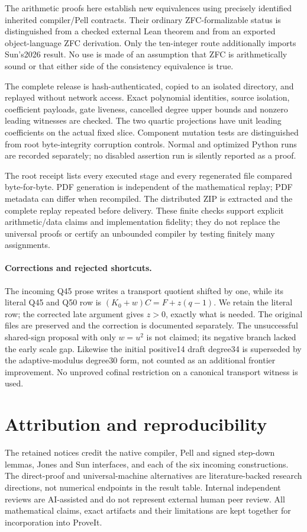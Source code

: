 \documentclass[11pt]{article}
\begin{document}
The arithmetic proofs here establish new equivalences using precisely
identified inherited compiler/Pell contracts. Their ordinary ZFC-formalizable
status is distinguished from a checked external Lean theorem and from an
exported object-language ZFC derivation. Only the ten-integer route additionally
imports Sun's2026 result. No use is made of an assumption that ZFC is
arithmetically sound or that either side of the consistency equivalence is true.

The complete release is hash-authenticated, copied to an isolated directory,
and replayed without network access. Exact polynomial identities, source
isolation, coefficient payloads, gate liveness, cancelled degree upper bounds
and nonzero leading witnesses are checked. The two quartic projections have
unit leading coefficients on the actual fixed slice. Component mutation
tests are distinguished from root byte-integrity corruption controls.
Normal and optimized Python runs are recorded separately; no disabled
assertion run is silently reported as a proof.

The root receipt lists every executed stage and every regenerated file
compared byte-for-byte. PDF generation is independent of the mathematical
replay; PDF metadata can differ when recompiled. The distributed ZIP is
extracted and the complete replay repeated before delivery. These finite
checks support explicit arithmetic/data claims and implementation fidelity;
they do not replace the universal proofs or certify an unbounded compiler
by testing finitely many assignments.

\paragraph{Corrections and rejected shortcuts.}
The incoming Q45 prose writes a transport quotient shifted by one, while its
literal Q45 and Q50 row is $(K_0+w)C=F+z(q-1)$. We retain the literal row;
the corrected late argument gives $z>0$, exactly what is needed. The
original files are preserved and the correction is documented separately.
The unsuccessful shared-sign proposal with only $w=u^2$ is not claimed;
its negative branch lacked the early scale gap. Likewise the initial
positive14 draft degree34 is superseded by the adaptive-modulus degree30
form, not counted as an additional frontier improvement. No unproved
cofinal restriction on a canonical transport witness is used.

\section*{Attribution and reproducibility}
The retained notices credit the native compiler, Pell and signed step-down
lemmas, Jones and Sun interfaces, and each of the six incoming constructions.
The direct-proof and universal-machine alternatives are literature-backed
research directions, not numerical endpoints in the result table. Internal
independent reviews are AI-assisted and do not represent external human
peer review. All mathematical claims, exact artifacts and their limitations
are kept together for incorporation into ProveIt.
\end{document}
